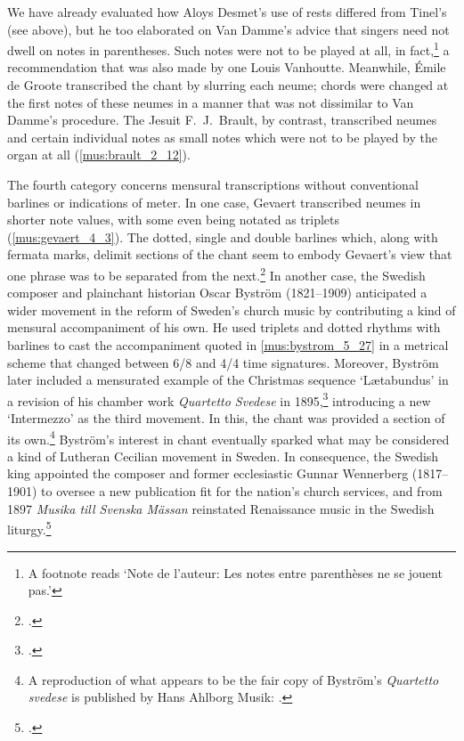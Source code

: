 We have already evaluated how Aloys Desmet's use of rests differed from Tinel's (see  above), but he too elaborated on Van Damme's advice that singers need not dwell on notes in parentheses.
Such notes were not to be played at all, in fact,\footnote{A footnote reads `Note de l'auteur: Les notes entre parenthèses ne se jouent pas.'} a recommendation that was also made by one Louis Vanhoutte.
Meanwhile, Émile de Groote transcribed the chant by slurring each neume; chords were changed at the first notes of these neumes in a manner that was not dissimilar to Van Damme's procedure.
The Jesuit F.~J.~Brault, by contrast, transcribed neumes and certain individual notes as small notes which were not to be played by the organ at all (\cref{mus:brault_2_12}).

The fourth category concerns mensural transcriptions without conventional barlines or indications of meter.
In one case, Gevaert transcribed neumes in shorter note values, with some even being notated as triplets (\cref{mus:gevaert_4_3}).
The dotted, single and double barlines which, along with fermata marks, delimit sections of the chant seem to embody Gevaert's view that one phrase was to be separated from the next.\footnote{\cite[2:12, 16--17, 19; 4:2--3]{Melodieschantgregorien1892}.}
In another case, the Swedish composer and plainchant historian Oscar Byström (1821--1909) anticipated a wider movement in the reform of Sweden's church music by contributing a kind of mensural accompaniment of his own.
He used triplets and dotted rhythms with barlines to cast the accompaniment quoted in \cref{mus:bystrom_5_27} in a metrical scheme that changed between 6/8 and 4/4 time signatures.
Moreover, Byström later included a mensurated example of the Christmas sequence `Lætabundus' in a revision of his chamber work \emph{Quartetto Svedese} in 1895,\footcite[210]{JullanderRetainingFineBouquet2008} introducing a new `Intermezzo' as the third movement.
In this, the chant was provided a section of its own.\footnote{A reproduction of what appears to be the fair copy of Byström's \emph{Quartetto svedese} is published by Hans Ahlborg Musik: \cite{BystromStringQuartetSwedish}.}
Byström's interest in chant eventually sparked what may be considered a kind of Lutheran Cecilian movement in Sweden.
In consequence, the Swedish king appointed the composer and former ecclesiastic Gunnar Wennerberg (1817--1901) to oversee a new publication fit for the nation's church services, and from 1897 \emph{Musika till Svenska Mässan} reinstated Renaissance music in the Swedish liturgy.\footcite[58]{JullanderGregoriansksangsvensk2012}

